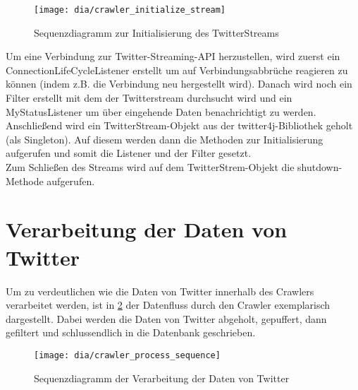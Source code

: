 \begin{figure}[h!]
	\centering
	\texttt{[image: dia/crawler\_initialize\_stream]}
	\caption{Sequenzdiagramm zur Initialisierung des TwitterStreams}
	\label{fig:initialize_stream}
\end{figure}

Um eine Verbindung zur Twitter-Streaming-API herzustellen, wird zuerst ein ConnectionLifeCycleListener erstellt um auf Verbindungsabbrüche reagieren zu können (indem z.B. die Verbindung neu hergestellt wird). Danach wird noch ein Filter erstellt mit dem der Twitterstream durchsucht wird und ein MyStatusListener um über eingehende Daten benachrichtigt zu werden.
Anschließend wird ein TwitterStream-Objekt aus der twitter4j-Bibliothek geholt (als Singleton). Auf diesem werden dann die Methoden zur Initialisierung aufgerufen und somit die Listener und der Filter gesetzt.\\
Zum Schließen des Streams wird auf dem TwitterStrem-Objekt die shutdown-Methode aufgerufen.

\section{Verarbeitung der Daten von Twitter}
Um zu verdeutlichen wie die Daten von Twitter innerhalb des Crawlers verarbeitet werden, ist in \cref{fig:crawler_process} der Datenfluss durch den Crawler exemplarisch dargestellt. Dabei werden die Daten von Twitter abgeholt, gepuffert, dann gefiltert und schlussendlich in die Datenbank geschrieben.

\begin{figure}[h!]
	\centering
	\texttt{[image: dia/crawler\_process\_sequence]}
	\caption{Sequenzdiagramm der Verarbeitung der Daten von Twitter}
	\label{fig:crawler_process}
\end{figure}

